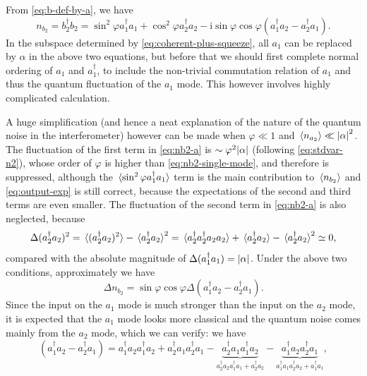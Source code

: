\documentclass[hyperref, a4paper]{article}
\newcommand*{\ii}{\mathrm{i}}
\begin{document}
From \eqref{eq:b-def-by-a}, we have 
\begin{equation}
    n_{b_2} = b_2^\dagger b_2 = 
    \sin^2 \varphi a_1^\dagger a_1 + \cos^2 \varphi a_2^\dagger a_2
    - \ii \sin \varphi \cos \varphi (a_1^\dagger a_2 - a_2^\dagger a_1).
    \label{eq:nb2-a}
\end{equation}
In the subspace determined by \eqref{eq:coherent-plus-squeeze},
all $a_1$ can be replaced by $\alpha$ in the above two equations,
but before that we should first complete normal ordering of $a_1$ and $a_1^\dagger$,
to include the non-trivial commutation relation of $a_1$
and thus the quantum fluctuation of the $a_1$ mode.
This however involves highly complicated calculation.

A huge simplification 
(and hence a neat explanation of the nature of the quantum noise in the interferometer) 
however can be made when $\varphi \ll 1$ and $\expval*{n_{a_2}} \ll \abs{\alpha}^2$.
The fluctuation of the first term in \eqref{eq:nb2-a} is $\sim \varphi^2 \abs{\alpha}$
(following \eqref{eq:stdvar-n2}),
whose order of $\varphi$ is higher than \eqref{eq:nb2-single-mode},
and therefore is suppressed,
although the $\expval*{\sin^2 \varphi a_1^\dagger a_1}$ term 
is the main contribution to $\expval*{n_{b_2}}$
and \eqref{eq:output-exp} is still correct,
because the expectations of the second and third terms are even smaller. 
The fluctuation of the second term in \eqref{eq:nb2-a} is also neglected,
because 
\begin{equation}
    \Delta (a_2^\dagger a_2)^2 = \expval*{ (a_2^\dagger a_2)^2 } - \expval*{ a_2^\dagger a_2 }^2 = 
    \expval*{a_2^\dagger a_2^\dagger a_2 a_2} + \expval*{a_2^\dagger a_2} - \expval*{ a_2^\dagger a_2 }^2 \simeq 0,
\end{equation}
compared with the absolute magnitude of 
$\Delta (a_1^\dagger a_1) = \abs{\alpha}$.
Under the above two conditions, approximately we have 
\begin{equation}
    \Delta n_{b_2} = \sin \varphi \cos \varphi \Delta (a_1^\dagger a_2 - a_2^\dagger a_1 ) .
\end{equation}
Since the input on the $a_1$ mode is much stronger than the input on the $a_2$ mode,
it is expected that the $a_1$ mode looks more classical and 
the quantum noise comes mainly from the $a_2$ mode,
which we can verify:
we have 
\[
    (a_1^\dagger a_2 - a_2^\dagger a_1)
    = a_1^\dagger a_2 a_1^\dagger a_2
    + a_2^\dagger a_1 a_2^\dagger a_1
    - \underbrace{a_2^\dagger a_1 a_1^\dagger a_2}_{a_2^\dagger a_2 a_1^\dagger a_1 + a_2^\dagger a_2}
    - \underbrace{a_1^\dagger a_2 a_2^\dagger a_1}_{a_1^\dagger a_1 a_2^\dagger a_2 + a_1^\dagger a_1},
\]
\end{document}
